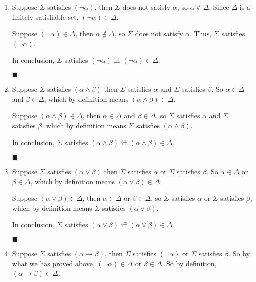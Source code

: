 \documentclass[11pt]{article}
\begin{document}
	\begin{enumerate}[(1)]
		\item Suppose $\Sigma$ satisfies $(\neg \alpha)$, then $\Sigma$ does not satisfy $\alpha$, so $\alpha \notin \Delta$. Since $\Delta$ is a finitely satisfiable set, $(\neg \alpha) \in \Delta$.
		
			Suppose $(\neg \alpha) \in \Delta$, then $\alpha \notin \Delta$, so $\Sigma$ does not satisfy $\alpha$. Thus, $\Sigma$ satisfies $(\neg \alpha)$.
			
			In conclusion, $\Sigma$ satisfies $(\neg \alpha)$ iff $(\neg \alpha) \in \Delta$.
			
			$\blacksquare$
			
		\item Suppose $\Sigma$ satisfies $(\alpha \wedge \beta)$ then $\Sigma$ satisfies $\alpha$ and $\Sigma$ satisfies $\beta$. So $\alpha \in \Delta$ and $\beta \in \Delta$, which by definition means $(\alpha \wedge \beta) \in \Delta$.
		
			Suppose $(\alpha \wedge \beta) \in \Delta$, then $\alpha \in \Delta$ and $\beta \in \Delta$, so $\Sigma$ satisfies $\alpha$ and $\Sigma$ satisfies $\beta$, which by definition means $\Sigma$ satisfies $(\alpha \wedge \beta)$.
			
			In conclusion, $\Sigma$ satisfies $(\alpha \wedge \beta)$ iff $(\alpha \wedge \beta) \in \Delta$.
			
			$\blacksquare$
			
			\item Suppose $\Sigma$ satisfies $(\alpha \vee \beta)$ then $\Sigma$ satisfies $\alpha$ or $\Sigma$ satisfies $\beta$. So $\alpha \in \Delta$ or $\beta \in \Delta$, which by definition means $(\alpha \vee \beta) \in \Delta$.
		
			Suppose $(\alpha \vee \beta) \in \Delta$, then $\alpha \in \Delta$ or $\beta \in \Delta$, so $\Sigma$ satisfies $\alpha$ or $\Sigma$ satisfies $\beta$, which by definition means $\Sigma$ satisfies $(\alpha \vee \beta)$.
			
			In conclusion, $\Sigma$ satisfies $(\alpha \vee \beta)$ iff $(\alpha \vee \beta) \in \Delta$.
			
			$\blacksquare$
			
			\item Suppose $\Sigma$ satisfies $(\alpha \rightarrow \beta)$, then $\Sigma$ satisfies $(\neg \alpha)$ or $\Sigma$ satisfies $\beta$. So by what we has proved above, $(\neg\alpha) \in \Delta$ or $\beta \in \Delta$. So by definition, $(\alpha \rightarrow \beta) \in \Delta$.
			

\end{enumerate}
\end{document}
